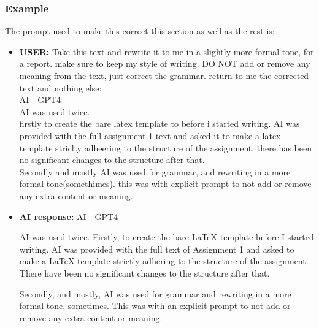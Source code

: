 \documentclass[11pt]{article}
\begin{document}
\subsubsection*{Example}
The prompt used to make this correct this section as well as the rest is;
\begin{itemize}
  \item \textbf{USER:} Take this text and rewrite it to me in a slightly more formal tone, for a report. make sure to keep my style of writing. DO NOT add or remove any meaning from the text, just correct the grammar. return to me the corrected text and nothing else: \\
  
  AI - GPT4 \\
  AI was used twice. \\
  firstly to create the bare latex template to before i started writing. AI was provided with the full assignment 1 text and asked it to make a latex template striclty adheering to the structure of the assignment. there has been no significant changes to the structure after that.\\

  Secondly and mostly AI was used for grammar, and rewriting in a more formal tone(somethimes). this was with explicit prompt to not add or remove any extra content or meaning.
  \item \textbf{AI response:} AI - GPT4

  AI was used twice. Firstly, to create the bare LaTeX template before I started writing. AI was provided with the full text of Assignment 1 and asked to make a LaTeX template strictly adhering to the structure of the assignment. There have been no significant changes to the structure after that.
  
  Secondly, and mostly, AI was used for grammar and rewriting in a more formal tone, sometimes. This was with an explicit prompt to not add or remove any extra content or meaning.
  \end{itemize}
\end{document}
